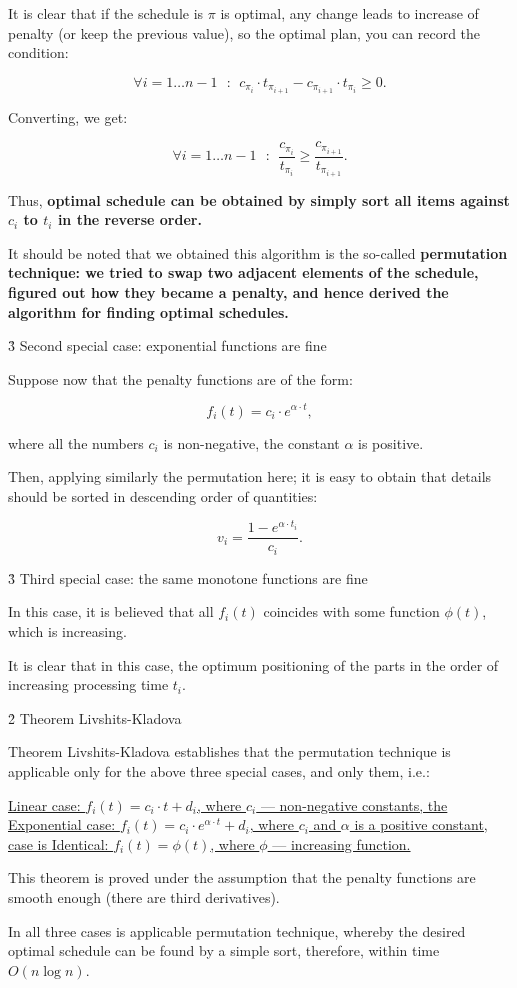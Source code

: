 It is clear that if the schedule is $\pi$ is optimal, any change leads to increase of penalty (or keep the previous value), so the optimal plan, you can record the condition:

$$ \forall i=1 \ldots n-1 ~~~:~~ c_{\pi_i} \cdot t_{\pi_{i+1}} - c_{\pi_{i+1}} \cdot t_{\pi_i} \ge 0. $$

Converting, we get:

$$ \forall i=1 \ldots n-1 ~~~:~~ \frac{ c_{\pi_i} }{ t_{\pi_i} } \ge \frac{ c_{\pi_{i+1}} }{ t_{\pi_{i+1}} }. $$

Thus, \bf{optimal schedule} can be obtained by simply \bf{sort} all items against $c_i$ to $t_i$ in the reverse order.

It should be noted that we obtained this algorithm is the so-called \bf{permutation technique}: we tried to swap two adjacent elements of the schedule, figured out how they became a penalty, and hence derived the algorithm for finding optimal schedules.


\h3{ Second special case: exponential functions are fine }

Suppose now that the penalty functions are of the form:

$$ f_i(t) = c_i \cdot e^{\alpha \cdot t}, $$

where all the numbers $c_i$ is non-negative, the constant $\alpha$ is positive.

Then, applying similarly the permutation here; it is easy to obtain that details should be sorted in descending order of quantities:

$$ v_i = \frac{ 1 - e^{ \alpha \cdot t_i } }{ c_i }. $$


\h3{ Third special case: the same monotone functions are fine }

In this case, it is believed that all $f_i(t)$ coincides with some function $\phi(t)$, which is increasing.

It is clear that in this case, the optimum positioning of the parts in the order of increasing processing time $t_i$.


\h2{ Theorem Livshits-Kladova }

Theorem Livshits-Kladova establishes that the permutation technique is applicable only for the above three special cases, and only them, i.e.:

\ul{
\li Linear case: $f_i(t) = c_i \cdot t + d_i$, where $c_i$ --- non-negative constants,
\li the Exponential case: $f_i(t) = c_i \cdot e^{\alpha \cdot t} + d_i$, where $c_i$ and $\alpha$ is a positive constant,
\li case is Identical: $f_i(t) = \phi(t)$, where $\phi$ --- increasing function.
}

This theorem is proved under the assumption that the penalty functions are smooth enough (there are third derivatives).

In all three cases is applicable permutation technique, whereby the desired optimal schedule can be found by a simple sort, therefore, within time $O (n \log n)$.

